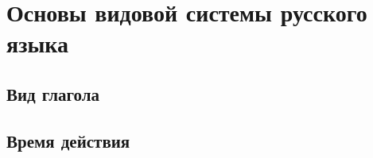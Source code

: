 \section{Основы видовой системы русского языка}

\subsection{Вид глагола}

\subsection{Время действия}
